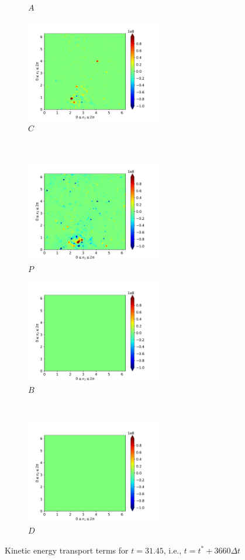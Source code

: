 \begin{figure}[H]
\begin{subfigure}{0.45\textwidth}
        \caption{$A$}
    \end{subfigure}
    \newline
    \begin{subfigure}{0.45\textwidth}
        \includegraphics[height=1.75in]{media/run-cds-65-5k/C-ke-4750}
        \caption{$C$}
    \end{subfigure}
    ~
    \begin{subfigure}{0.45\textwidth}
        \includegraphics[height=1.75in]{media/run-cds-65-5k/P-ke-4750}
        \caption{$P$}
    \end{subfigure}
    \newline
    \begin{subfigure}{0.45\textwidth}
        \includegraphics[height=1.75in]{media/run-cds-65-5k/B-ke-4750}
        \caption{$B$}
    \end{subfigure}
    ~
    \begin{subfigure}{0.45\textwidth}
        \includegraphics[height=1.75in]{media/run-cds-65-5k/D-ke-4750}
        \caption{$D$}
    \end{subfigure}
    \caption{Kinetic energy transport terms for $t=31.45$, i.e., $t=t^{\ast} + 3660 \Delta t$}
    \label{fig:ke-4750}
\end{figure}
